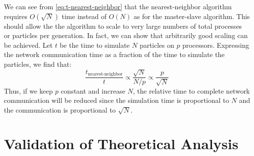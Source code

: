 We can see from \eqref{eq:t-nearest-neighbor} that the nearest-neighbor
algorithm requires $O(\sqrt{N})$ time instead of $O(N)$ as for the master-slave
algorithm. This should allow the the algorithm to scale to very large numbers of
total processes or particles per generation. In fact, we can show that
arbitrarily good scaling can be achieved. Let $t$ be the time to simulate $N$
particles on $p$ processors. Expressing the network communication time as a
fraction of the time to simulate the particles, we find that:
\begin{equation}
  \frac{t_{\text{nearest-neighbor}}}{t} \propto \frac{\sqrt{N}}{N/p} \propto
  \frac{p}{\sqrt{N}}
\end{equation}
Thus, if we keep $p$ constant and increase $N$, the relative time to complete
network communication will be reduced since the simulation time is proportional
to $N$ and the communication is proportional to $\sqrt{N}$.

\section{Validation of Theoretical Analysis}
\label{sec:fission-bank-validation}

